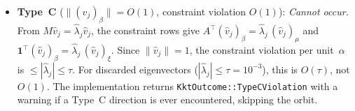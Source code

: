 \begin{unverified}
\begin{remark}
\begin{itemize}
\item \textbf{Type~C} ($\|(\hat v_j)_\beta\| = O(1)$,
  constraint violation $O(1)$):
  \emph{Cannot occur.}
  From $M\hat v_j = \hat\lambda_j \hat v_j$,
  the constraint rows give
  $A^\top (\hat v_j)_\beta = \hat\lambda_j\, (\hat v_j)_\mu$
  and
  $\mathbf{1}^\top (\hat v_j)_\beta = \hat\lambda_j\, (\hat v_j)_\xi$.
  Since $\|\hat v_j\| = 1$,
  the constraint violation per unit~$\alpha$ is
  $\leq |\hat\lambda_j| \leq \tau$.
  For discarded eigenvectors ($|\hat\lambda_j| \leq \tau = 10^{-3}$),
  this is $O(\tau)$, not $O(1)$.
  The implementation returns \texttt{KktOutcome::TypeCViolation}
  with a warning if a Type~C direction is ever encountered,
  skipping the orbit.
\end{itemize}
\end{remark}
\end{unverified}

